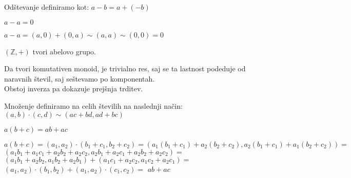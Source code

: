 \begin{definicija}
    Odštevanje definiramo kot: $a - b = a + (-b)$
\end{definicija}

\begin{trditev}
    $a - a = 0$
\end{trditev}
\begin{dokaz}
    $a - a = (a, 0) + (0, a) \sim (a, a) \sim (0, 0) = 0$
\end{dokaz}

\begin{trditev}
    $(\mathbb{Z}, +)$ tvori abelovo grupo.
\end{trditev}
\begin{dokaz}
    Da tvori komutativen monoid, je trivialno res, saj se ta lastnost podeduje od naravnih števil, saj seštevamo po komponentah. \\
    Obstoj inverza pa dokazuje prejšnja trditev.
\end{dokaz}

\begin{definicija}
    Množenje definiramo na celih številih na naslednji način: \\
    $(a, b) \cdot (c, d) \sim (ac + bd, ad + bc)$ \\
\end{definicija}

\begin{trditev}
    $a(b + c) = ab + ac$
\end{trditev}
\begin{dokaz}
    $a(b + c) = (a_1, a_2)\cdot(b_1 + c_1, b_2 + c_2) = (a_1(b_1 + c_1) + a_2(b_2 + c_2), a_2(b_1 + c_1) + a_1(b_2 + c_2)) =$
    $(a_1 b_1 + a_1 c_1 + a_2 b_2 + a_2 c_2, a_2 b_1 + a_2 c_1 + a_2 b_2 + a_2 c_2) = $
    $(a_1 b_1 + a_2 b_2, a_1 b_2 + a_2 b_1) + (a_1 c_1 + a_2 c_2, a_1 c_2 + a_2 c_1) =$
    $(a_1, a_2)\cdot(b_1, b_2) + (a_1, a_2)\cdot(c_1, c_2) =$
    $ab + ac$
\end{dokaz}

